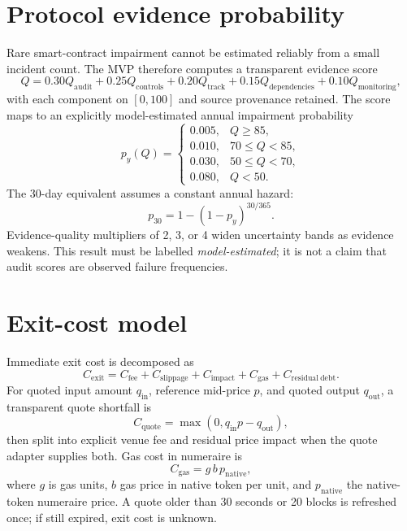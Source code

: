 \documentclass[11pt,a4paper]{article}
\begin{document}
\section{Protocol evidence probability}

Rare smart-contract impairment cannot be estimated reliably from a small
incident count.  The MVP therefore computes a transparent evidence score
\begin{equation}
Q=0.30Q_{\mathrm{audit}}+0.25Q_{\mathrm{controls}}+0.20Q_{\mathrm{track}}
  +0.15Q_{\mathrm{dependencies}}+0.10Q_{\mathrm{monitoring}},
\end{equation}
with each component on $[0,100]$ and source provenance retained.  The score maps
to an explicitly model-estimated annual impairment probability
\begin{equation}
p_y(Q)=
\begin{cases}
0.005,&Q\geq85,\\
0.010,&70\leq Q<85,\\
0.030,&50\leq Q<70,\\
0.080,&Q<50.
\end{cases}
\end{equation}
The 30-day equivalent assumes a constant annual hazard:
\begin{equation}
p_{30}=1-(1-p_y)^{30/365}.
\end{equation}
Evidence-quality multipliers of 2, 3, or 4 widen uncertainty bands as evidence
weakens.  This result must be labelled \emph{model-estimated}; it is not a claim
that audit scores are observed failure frequencies.

\section{Exit-cost model}

Immediate exit cost is decomposed as
\begin{equation}
C_{\mathrm{exit}}=C_{\mathrm{fee}}+C_{\mathrm{slippage}}+C_{\mathrm{impact}}
 +C_{\mathrm{gas}}+C_{\mathrm{residual\ debt}}.
\end{equation}
For quoted input amount $q_{\mathrm{in}}$, reference mid-price $p$, and quoted
output $q_{\mathrm{out}}$, a transparent quote shortfall is
\begin{equation}
C_{\mathrm{quote}}=\max(0,q_{\mathrm{in}}p-q_{\mathrm{out}}),
\end{equation}
then split into explicit venue fee and residual price impact when the quote
adapter supplies both.  Gas cost in numeraire is
\begin{equation}
C_{\mathrm{gas}}=g\,b\,p_{\mathrm{native}},
\end{equation}
where $g$ is gas units, $b$ gas price in native token per unit, and
$p_{\mathrm{native}}$ the native-token numeraire price.  A quote older than 30
seconds or 20 blocks is refreshed once; if still expired, exit cost is unknown.
\end{document}
